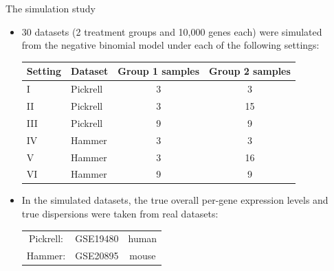 \documentclass{beamer}
\begin{document}
\begin{frame}
\begin{columns}[t]
\begin{column}{.33\linewidth}
    

\end{column}    











\begin{column}{.33\linewidth}



\begin{block}{The simulation study}
\begin{itemize}
\item 30 datasets (2 treatment groups and 10,000 genes each) were simulated from the negative binomial model under each of the following settings: \newline

\begin{center}
\begin{tabular}{llcc}
Setting & Dataset & Group 1 samples & Group 2 samples \\ \hline
I & Pickrell & 3 & 3 \\ \hline
II & Pickrell & 3 & 15 \\ \hline
III & Pickrell & 9 & 9 \\ \hline
IV & Hammer & 3 & 3 \\ \hline
V & Hammer & 3 & 16 \\ \hline
VI & Hammer & 9 & 9 \\
\end{tabular} 
\end{center} \vspace{1.03cm}

\item In the simulated datasets, the true overall per-gene expression levels and true dispersions were taken from real datasets: \newline

\begin{center}
\begin{tabular}{ccc}
Pickrell: & GSE19480 & human \\ 
Hammer: & GSE20895 & mouse 
\end{tabular}
\end{center}



\end{itemize}
\end{block}
\end{column}
\end{columns}
\end{frame}
\end{document}
